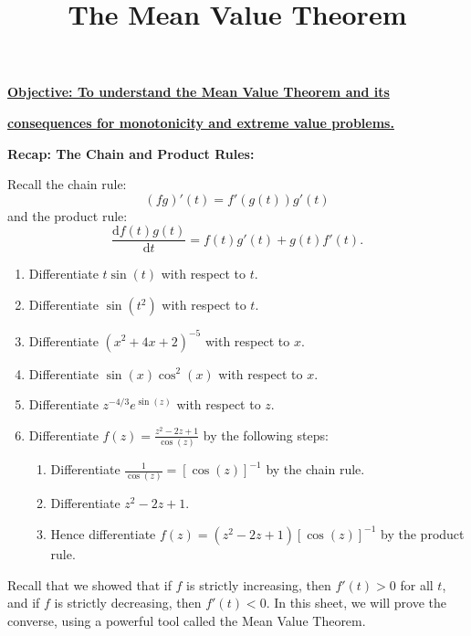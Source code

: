 \documentclass{article}
\newcommand{\deriv}[2]{\frac{\mathrm{d}#1}{\mathrm{d}#2}}
\begin{document}
\title{The Mean Value Theorem}
\date{}

\maketitle
\thispagestyle{empty}

\Large

\textbf{\underline{Objective: To understand the Mean Value Theorem and its}}

\textbf{\underline{consequences for monotonicity and extreme value problems.}}




\vspace{5mm}


\textbf{Recap: The Chain and Product Rules:}

\vspace{5mm}

Recall the chain rule:
\[(fg)'(t)=f'(g(t))g'(t)\]
and the product rule:
\[\deriv{f(t)g(t)}{t}=f(t)g'(t)+g(t)f'(t).\]
\begin{enumerate}
	\item Differentiate $t\sin(t)$ with respect to $t$.
	\item Differentiate $\sin(t^2)$ with respect to $t$.
	\item Differentiate $(x^2+4x+2)^{-5}$ with respect to $x$.
	\item Differentiate $\sin(x)\cos^2(x)$ with respect to $x$.
	\item Differentiate $z^{-4/3}e^{\sin(z)}$ with respect to $z$.
	\item Differentiate $f(z)=\frac{z^2-2z+1}{\cos(z)}$ by the following steps:
		\begin{enumerate}
			\item Differentiate $\frac{1}{\cos(z)}=[\cos(z)]^{-1}$ by the chain rule.
			\item Differentiate $z^2-2z+1$.
			\item Hence differentiate $f(z)=(z^2-2z+1)[\cos(z)]^{-1}$ by the product rule.
		\end{enumerate}
\end{enumerate}

\bigskip


Recall that we showed that if $f$ is strictly increasing, then $f'(t)>0$ for all $t$, and if $f$ is strictly decreasing, then $f'(t)<0$. In this sheet, we will prove the converse, using a powerful tool called the Mean Value Theorem.



\clearpage
\end{document}
